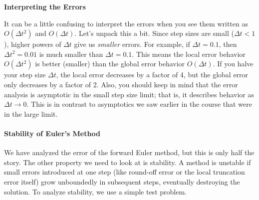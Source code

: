 \begin{warningBox}
    \textbf{Interpreting the Errors}

    It can be a little confusing to interpret the errors when you see them written as $O(\Delta t^2)$ and $O(\Delta t)$. Let's unpack this a bit. Since step sizes are small ($\Delta t < 1$), higher powers of $\Delta t$ give us \emph{smaller} errors. For example, if $\Delta t = 0.1$, then $\Delta t^2 = 0.01$ is much smaller than $\Delta t = 0.1$. This means the local error behavior $O(\Delta t^2)$ is better (smaller) than the global error behavior $O(\Delta t)$. If you halve your step size $\Delta t$, the local error decreases by a factor of 4, but the global error only decreases by a factor of 2. Also, you should keep in mind that the error analysis is asymptotic in the small step size limit; that is, it describes behavior as $\Delta t \to 0$. This is in contrast to asymptotics we saw earlier in the course that were in the large limit.
\end{warningBox}

\paragraph*{Stability of Euler's Method}

We have analyzed the error of the forward Euler method, but this is only half the story. The other property we need to look at is stability. A method is unstable if small errors introduced at one step (like round-off error or the local truncation error itself) grow unboundedly in subsequent steps, eventually destroying the solution. To analyze stability, we use a simple test problem.


